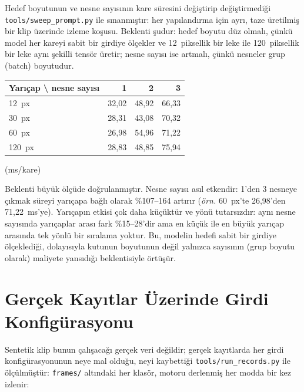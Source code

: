 Hedef boyutunun ve nesne sayısının kare süresini değiştirip
değiştirmediği \texttt{tools/sweep\_prompt.py} ile sınanmıştır: her
yapılandırma için ayrı, taze üretilmiş bir klip üzerinde izleme
koşusu. Beklenti şudur: hedef boyutu düz olmalı, çünkü model her
kareyi sabit bir girdiye ölçekler ve 12~piksellik bir leke ile
120~piksellik bir leke aynı şekilli tensör üretir; nesne sayısı ise
artmalı, çünkü nesneler grup (batch) boyutudur.

\begin{olcum}[title={Ölçüldü (cihazda, nokta başına 1000 kare, ilk 30
ısınma hariç 970 kare ölçülen, \texttt{configs/edgetam\_trt.yaml})}]
\begin{center}
\begin{tabular}{lrrr}
  \toprule
  Yarıçap \textbackslash{} nesne sayısı & 1 & 2 & 3 \\
  \midrule
  12~px  & 32,02 & 48,92 & 66,33 \\
  30~px  & 28,31 & 43,08 & 70,32 \\
  60~px  & 26,98 & 54,96 & 71,22 \\
  120~px & 28,83 & 48,85 & 75,94 \\
  \bottomrule
\end{tabular}
\end{center}
(ms/kare)
\end{olcum}

Beklenti büyük ölçüde doğrulanmıştır. Nesne sayısı asıl etkendir:
1'den 3 nesneye çıkmak süreyi yarıçapa bağlı olarak \%107--164 artırır
(\emph{örn.} 60~px'te 26,98'den 71,22~ms'ye). Yarıçapın etkisi çok
daha küçüktür ve yönü tutarsızdır: aynı nesne sayısında yarıçaplar
arası fark \%15--28'dir ama en küçük ile en büyük yarıçap arasında tek
yönlü bir sıralama yoktur. Bu, modelin hedefi sabit bir girdiye
ölçeklediği, dolayısıyla kutunun boyutunun değil yalnızca sayısının
(grup boyutu olarak) maliyete yansıdığı beklentisiyle örtüşür.

\section{Gerçek Kayıtlar Üzerinde Girdi Konfigürasyonu}
\label{sec:gercek-kayitlar}

Sentetik klip bunun çalışacağı gerçek veri değildir; gerçek
kayıtlarda her girdi konfigürasyonunun neye mal olduğu, neyi kaybettiği
\texttt{tools/run\_records.py} ile ölçülmüştür: \texttt{frames/}
altındaki her klasör, motoru derlenmiş her modda bir kez izlenir:

